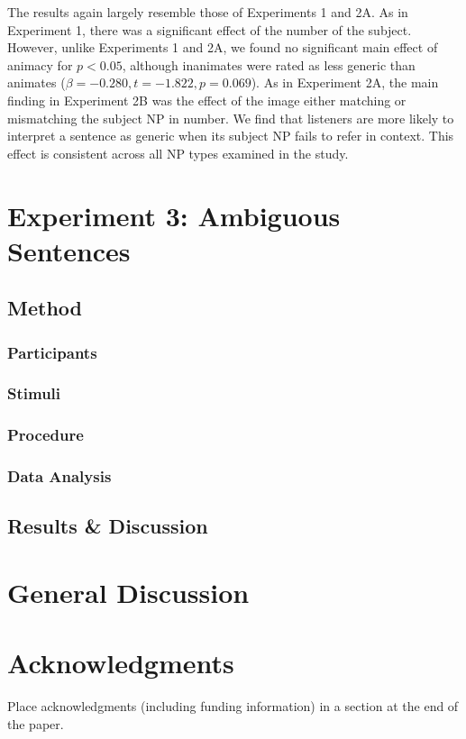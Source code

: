 \documentclass[10pt,letterpaper]{article}
\begin{document}
The results again largely resemble those of Experiments 1 and 2A. As in Experiment 1, there was a significant effect of the number of the subject. However, unlike Experiments 1 and 2A, we found no significant main effect of animacy for \(p < 0.05\), although inanimates were rated as less generic than animates (\(\beta = -0.280, t = -1.822, p = 0.069\)). As in Experiment 2A, the main finding in Experiment 2B was the effect of the image either matching or mismatching the subject NP in number. We find that listeners are more likely to interpret a sentence as generic when its subject NP fails to refer in context. This effect is consistent across all NP types examined in the study.

\section{Experiment 3: Ambiguous Sentences}

\subsection{Method} 

\subsubsection{Participants} \quad

\subsubsection{Stimuli} \quad

\subsubsection{Procedure} \quad

\subsubsection{Data Analysis} \quad

\subsection{Results \& Discussion}


\section{General Discussion}


\section{Acknowledgments}

Place acknowledgments (including funding information) in a section at
the end of the paper.



\setlength{\bibleftmargin}{.125in}
\setlength{\bibindent}{-\bibleftmargin}


\end{document}
